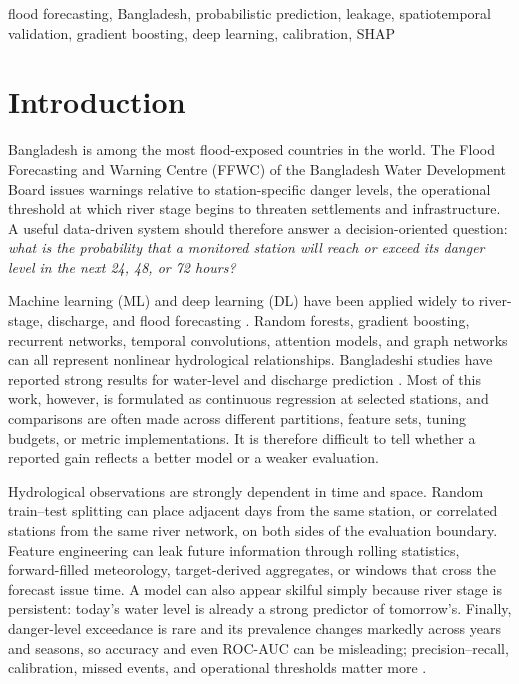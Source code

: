 \documentclass[conference]{IEEEtran}
\begin{document}
\begin{IEEEkeywords}
flood forecasting, Bangladesh, probabilistic prediction, leakage, spatiotemporal validation, gradient boosting, deep learning, calibration, SHAP
\end{IEEEkeywords}

\section{Introduction}

Bangladesh is among the most flood-exposed countries in the world. The Flood Forecasting and Warning Centre (FFWC) of the Bangladesh Water Development Board issues warnings relative to station-specific danger levels, the operational threshold at which river stage begins to threaten settlements and infrastructure. A useful data-driven system should therefore answer a decision-oriented question: \emph{what is the probability that a monitored station will reach or exceed its danger level in the next 24, 48, or 72 hours?}

Machine learning (ML) and deep learning (DL) have been applied widely to river-stage, discharge, and flood forecasting \cite{asif2025review,kuhaneswaran2025evolution,akinsoji2024integrating}. Random forests, gradient boosting, recurrent networks, temporal convolutions, attention models, and graph networks can all represent nonlinear hydrological relationships. Bangladeshi studies have reported strong results for water-level and discharge prediction \cite{noor2022water,islam2026climate,islam2025comparative}. Most of this work, however, is formulated as continuous regression at selected stations, and comparisons are often made across different partitions, feature sets, tuning budgets, or metric implementations. It is therefore difficult to tell whether a reported gain reflects a better model or a weaker evaluation.

Hydrological observations are strongly dependent in time and space. Random train--test splitting can place adjacent days from the same station, or correlated stations from the same river network, on both sides of the evaluation boundary. Feature engineering can leak future information through rolling statistics, forward-filled meteorology, target-derived aggregates, or windows that cross the forecast issue time. A model can also appear skilful simply because river stage is persistent: today's water level is already a strong predictor of tomorrow's. Finally, danger-level exceedance is rare and its prevalence changes markedly across years and seasons, so accuracy and even ROC-AUC can be misleading; precision--recall, calibration, missed events, and operational thresholds matter more \cite{saito2015precision}.
\end{document}
